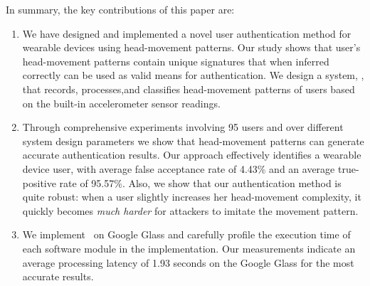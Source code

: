 
In summary, the key contributions of this paper are:

\begin{enumerate}

\item We have designed and implemented a novel user authentication method for wearable devices
using head-movement patterns. Our study shows that user's head-movement patterns
contain unique signatures that when inferred correctly can be used as valid
means for authentication. We design a system, \systemname, that records, processes,and classifies
head-movement patterns of users based on the built-in accelerometer sensor readings.


\item %
Through comprehensive experiments
involving 95 users and over
different system design parameters we show that head-movement patterns
can generate accurate authentication results. Our approach effectively identifies a wearable device user, with average false
acceptance rate of 4.43\% and an average true-positive rate of 95.57\%. Also, we show that our authentication method is quite robust: when a user slightly increases her head-movement complexity, it quickly becomes \emph{much harder} for attackers to imitate the movement pattern.



\item We implement \systemname~on Google Glass and carefully profile the
execution time of each software module in the implementation. Our measurements
indicate an average processing latency of 1.93 seconds on the Google Glass for the
most accurate results.

\end{enumerate}

